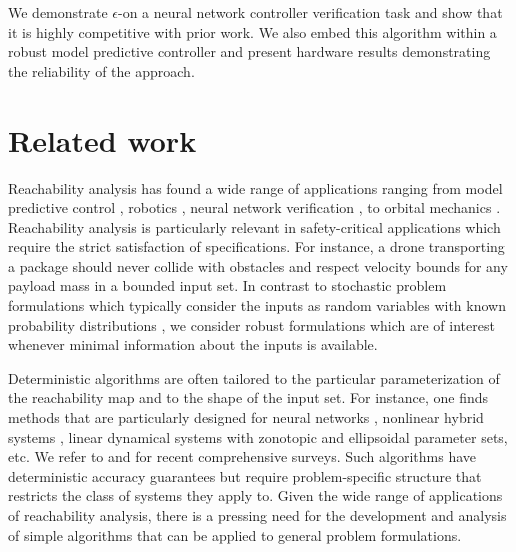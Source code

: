 \documentclass[12pt]{l4dc2022} %
\begin{document}
% 
% 
\vspace{-1mm}
% 
We demonstrate $\epsilon$-\randup on a neural network controller verification task and show that it is highly competitive with prior work. We also embed this algorithm within a robust model predictive controller and present hardware results demonstrating the reliability of the approach. 































\vspace{-1mm}

\section{Related work}\label{sec:related_work}

% 
% 
Reachability analysis has found a wide range of applications ranging from model predictive control \citep{Schurmann2018}, 
robotics \citep{Shao2021,LewEtAl2022}, 
neural network verification \citep{Tran2019,Hu2020},  
to orbital mechanics \citep{Wittig2015}. 
% 
Reachability analysis is particularly relevant in safety-critical applications which require the strict satisfaction of specifications. 
For instance, 
a drone transporting a package should never collide with obstacles and respect velocity bounds for any payload mass in a bounded input set. %
% 
% 
% 
% 
In contrast to stochastic problem formulations which typically consider the inputs as random variables with known probability distributions \citep{Webb2019,Sinha2020,DevonportL4DC2020}, 
we consider robust formulations which are of %
interest whenever minimal information about the inputs is available. 
% 






Deterministic %
algorithms are often tailored to the particular parameterization of the reachability map and to the shape of the input set. For instance, one finds methods that are particularly designed for neural networks \citep{Tran2019,IvanovVerisig2019,Hu2020}, 
nonlinear hybrid systems \citep{Chen2013,Kong2015}, 
linear dynamical systems with zonotopic \citep{Girard2005} and ellipsoidal \citep{Kurzhanski2000} parameter sets, 
etc.  
We refer to \citep{Liu2021} and \citep{Althoff2021} for recent comprehensive surveys. 
Such algorithms %
have deterministic accuracy guarantees but require problem-specific structure that restricts the class of systems 
they apply to. 
% 
Given the wide range of applications of reachability analysis, there is a pressing need for the development and analysis of simple algorithms that can be applied to general problem formulations. %
% 
% 
\end{document}
